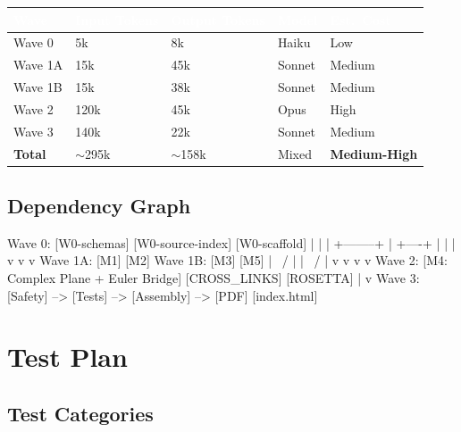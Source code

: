 \documentclass[11pt,letterpaper]{article}
\newcommand{\tableheader}[1]{\textbf{\sffamily\textcolor{white}{#1}}}
\begin{document}
\begin{center}
\begin{tabularx}{\textwidth}{L{3cm}C{2cm}C{2cm}C{2cm}C{2cm}}
\toprule
{}
\tableheader{Wave} & \tableheader{Input Tokens} & \tableheader{Output Tokens} & \tableheader{Model} & \tableheader{Est.\ Cost} \\
\midrule
Wave 0 & 5k & 8k & Haiku & Low \\
Wave 1A & 15k & 45k & Sonnet & Medium \\
Wave 1B & 15k & 38k & Sonnet & Medium \\
Wave 2 & 120k & 45k & Opus & High \\
Wave 3 & 140k & 22k & Sonnet & Medium \\
\midrule
\textbf{Total} & $\sim$295k & $\sim$158k & Mixed & \textbf{Medium-High} \\
\bottomrule
\end{tabularx}
\end{center}

\subsection{Dependency Graph}

\begin{asciibox}
Wave 0: [W0-schemas] [W0-source-index] [W0-scaffold]
             |              |                |
    +--------+              |           +----+
    |                       |           |
    v                       v           v
Wave 1A: [M1] [M2]    Wave 1B: [M3] [M5]
              |   \          /    |
              |    \        /     |
              v     v      v      v
Wave 2:  [M4: Complex Plane + Euler Bridge] [CROSS_LINKS] [ROSETTA]
                        |
                        v
Wave 3:  [Safety] --> [Tests] --> [Assembly] --> [PDF] [index.html]
\end{asciibox}

\section{Test Plan}

\subsection{Test Categories}
\end{document}
